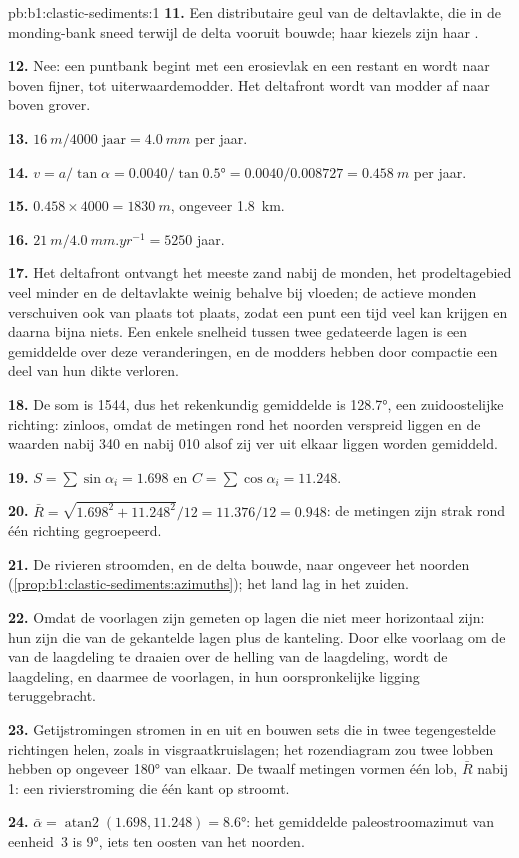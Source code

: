 \begin{solution}{pb:b1:clastic-sediments:1}
\textbf{11.} Een distributaire geul van de deltavlakte, die in de monding-bank sneed
terwijl de delta vooruit bouwde; haar kiezels zijn haar .

\textbf{12.} Nee: een puntbank begint met een erosievlak en een restant en wordt naar boven
fijner, tot uiterwaardemodder. Het deltafront wordt van modder af naar boven grover.

\textbf{13.} $\qty{16}{m}/\num{4000}\text{ jaar} = \qty{4.0}{mm}$ per jaar.

\textbf{14.} $v = a/\tan\alpha = 0.0040/\tan\ang{0.5} = 0.0040/0.008727 =
\qty{0.458}{m}$ per jaar.

\textbf{15.} $0.458 \times 4000 = \qty{1830}{m}$, ongeveer \qty{1.8}{km}.

\textbf{16.} $\qty{21}{m}/\qty{4.0}{mm.yr^{-1}} = 5250$ jaar.

\textbf{17.} Het deltafront ontvangt het meeste zand nabij de monden, het prodeltagebied
veel minder en de deltavlakte weinig behalve bij vloeden; de actieve monden verschuiven ook
van plaats tot plaats, zodat een punt een tijd veel kan krijgen en daarna bijna niets. Een
enkele snelheid tussen twee gedateerde lagen is een gemiddelde over deze veranderingen, en
de modders hebben door compactie een deel van hun dikte verloren.

\textbf{18.} De som is 1544, dus het rekenkundig gemiddelde is \ang{128.7}, een
zuidoostelijke richting: zinloos, omdat de metingen rond het noorden verspreid liggen en
de waarden nabij 340 en nabij 010 alsof zij ver uit elkaar liggen worden gemiddeld.

\textbf{19.} $S = \sum\sin\alpha_i = 1.698$ en $C = \sum\cos\alpha_i =
11.248$.

\textbf{20.} $\bar R = \sqrt{1.698^2 + 11.248^2}/12 = 11.376/12 = 0.948$: de metingen zijn
strak rond één richting gegroepeerd.

\textbf{21.} De rivieren stroomden, en de delta bouwde, naar ongeveer het noorden
(\cref{prop:b1:clastic-sediments:azimuths}); het land lag in het zuiden.

\textbf{22.} Omdat de voorlagen zijn gemeten op lagen die niet meer horizontaal zijn: hun
 zijn die van de gekantelde lagen plus de kanteling. Door elke voorlaag
om de  van de laagdeling te draaien over de helling van de laagdeling, wordt de
laagdeling, en daarmee de voorlagen, in hun oorspronkelijke ligging teruggebracht.

\textbf{23.} Getijstromingen stromen in en uit en bouwen sets die in twee tegengestelde
richtingen helen, zoals in visgraatkruislagen; het rozendiagram zou twee lobben hebben op
ongeveer \ang{180} van elkaar. De twaalf metingen vormen één lob, $\bar R$ nabij 1: een
rivierstroming die één kant op stroomt.

\textbf{24.} $\bar\alpha = \operatorname{atan2}(1.698, 11.248) = \ang{8.6}$: het gemiddelde
paleostroomazimut van eenheid~3 is \ang{9}, iets ten oosten van het noorden.
\end{solution}
